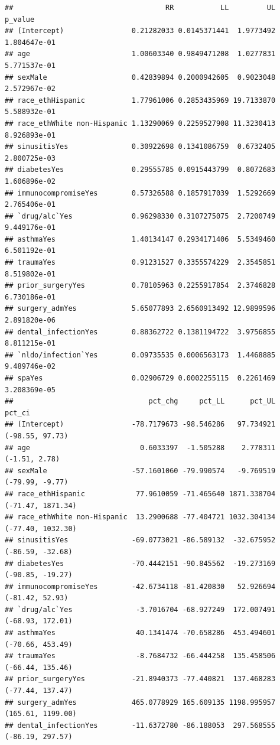 \documentclass[
]{article}
\begin{document}
\begin{verbatim}
##                                    RR           LL         UL      p_value
## (Intercept)                0.21282033 0.0145371441  1.9773492 1.804647e-01
## age                        1.00603340 0.9849471208  1.0277831 5.771537e-01
## sexMale                    0.42839894 0.2000942605  0.9023048 2.572967e-02
## race_ethHispanic           1.77961006 0.2853435969 19.7133870 5.588932e-01
## race_ethWhite non-Hispanic 1.13290069 0.2259527908 11.3230413 8.926893e-01
## sinusitisYes               0.30922698 0.1341086759  0.6732405 2.800725e-03
## diabetesYes                0.29555785 0.0915443799  0.8072683 1.606896e-02
## immunocompromiseYes        0.57326588 0.1857917039  1.5292669 2.765406e-01
## `drug/alc`Yes              0.96298330 0.3107275075  2.7200749 9.449176e-01
## asthmaYes                  1.40134147 0.2934171406  5.5349460 6.501192e-01
## traumaYes                  0.91231527 0.3355574229  2.3545851 8.519802e-01
## prior_surgeryYes           0.78105963 0.2255917854  2.3746828 6.730186e-01
## surgery_admYes             5.65077893 2.6560913492 12.9899596 2.891820e-06
## dental_infectionYes        0.88362722 0.1381194722  3.9756855 8.811215e-01
## `nldo/infection`Yes        0.09735535 0.0006563173  1.4468885 9.489746e-02
## spaYes                     0.02906729 0.0002255115  0.2261469 3.208369e-05
##                                pct_chg     pct_LL      pct_UL            pct_ci
## (Intercept)                -78.7179673 -98.546286   97.734921   (-98.55, 97.73)
## age                          0.6033397  -1.505288    2.778311     (-1.51, 2.78)
## sexMale                    -57.1601060 -79.990574   -9.769519   (-79.99, -9.77)
## race_ethHispanic            77.9610059 -71.465640 1871.338704 (-71.47, 1871.34)
## race_ethWhite non-Hispanic  13.2900688 -77.404721 1032.304134 (-77.40, 1032.30)
## sinusitisYes               -69.0773021 -86.589132  -32.675952  (-86.59, -32.68)
## diabetesYes                -70.4442151 -90.845562  -19.273169  (-90.85, -19.27)
## immunocompromiseYes        -42.6734118 -81.420830   52.926694   (-81.42, 52.93)
## `drug/alc`Yes               -3.7016704 -68.927249  172.007491  (-68.93, 172.01)
## asthmaYes                   40.1341474 -70.658286  453.494601  (-70.66, 453.49)
## traumaYes                   -8.7684732 -66.444258  135.458506  (-66.44, 135.46)
## prior_surgeryYes           -21.8940373 -77.440821  137.468283  (-77.44, 137.47)
## surgery_admYes             465.0778929 165.609135 1198.995957 (165.61, 1199.00)
## dental_infectionYes        -11.6372780 -86.188053  297.568555  (-86.19, 297.57)

\end{verbatim}
\end{document}
